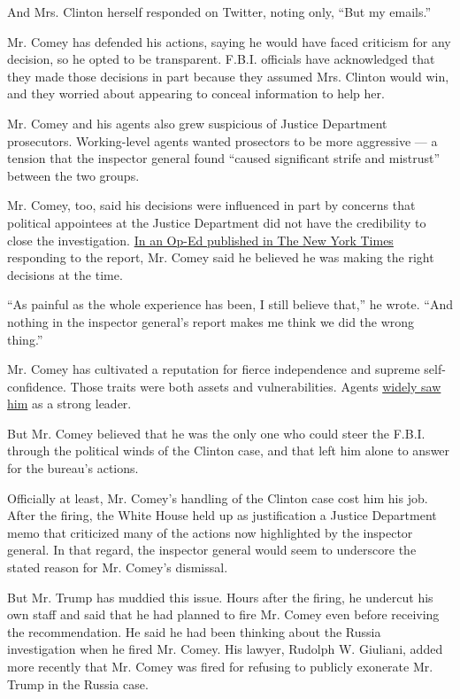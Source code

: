 And Mrs. Clinton herself responded on Twitter, noting only, ``But my
emails.''

Mr. Comey has defended his actions, saying he would have faced criticism
for any decision, so he opted to be transparent. F.B.I. officials have
acknowledged that they made those decisions in part because they assumed
Mrs. Clinton would win, and they worried about appearing to conceal
information to help her.

Mr. Comey and his agents also grew suspicious of Justice Department
prosecutors. Working-level agents wanted prosectors to be more
aggressive --- a tension that the inspector general found ``caused
significant strife and mistrust'' between the two groups.

Mr. Comey, too, said his decisions were influenced in part by concerns
that political appointees at the Justice Department did not have the
credibility to close the investigation.
\href{https://www.nytimes.com/2018/06/14/opinion/comey-clinton-inspector-general.html}{In
an Op-Ed published in The New York Times} responding to the report, Mr.
Comey said he believed he was making the right decisions at the time.

``As painful as the whole experience has been, I still believe that,''
he wrote. ``And nothing in the inspector general's report makes me think
we did the wrong thing.''

Mr. Comey has cultivated a reputation for fierce independence and
supreme self-confidence. Those traits were both assets and
vulnerabilities. Agents
\href{https://www.nytimes.com/2017/08/16/us/politics/comey-fbi-agents-confidence-survey.html}{widely
saw him} as a strong leader.

But Mr. Comey believed that he was the only one who could steer the
F.B.I. through the political winds of the Clinton case, and that left
him alone to answer for the bureau's actions.

Officially at least, Mr. Comey's handling of the Clinton case cost him
his job. After the firing, the White House held up as justification a
Justice Department memo that criticized many of the actions now
highlighted by the inspector general. In that regard, the inspector
general would seem to underscore the stated reason for Mr. Comey's
dismissal.

But Mr. Trump has muddied this issue. Hours after the firing, he
undercut his own staff and said that he had planned to fire Mr. Comey
even before receiving the recommendation. He said he had been thinking
about the Russia investigation when he fired Mr. Comey. His lawyer,
Rudolph W. Giuliani, added more recently that Mr. Comey was fired for
refusing to publicly exonerate Mr. Trump in the Russia case.


